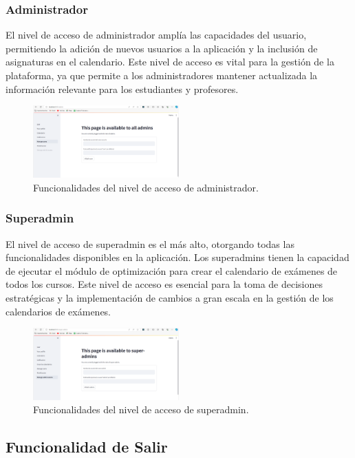 \documentclass{article}
\begin{document}
\subsubsection{Administrador}

El nivel de acceso de administrador amplía las capacidades del usuario, permitiendo la adición de nuevos usuarios a la aplicación y la inclusión de asignaturas en el calendario. Este nivel de acceso es vital para la gestión de la plataforma, ya que permite a los administradores mantener actualizada la información relevante para los estudiantes y profesores.

\begin{figure}[h!] \centering \includegraphics[width=0.5\textwidth]{nivel_administrador.png} \caption{Funcionalidades del nivel de acceso de administrador.} \end{figure}

\subsubsection{Superadmin}

El nivel de acceso de superadmin es el más alto, otorgando todas las funcionalidades disponibles en la aplicación. Los superadmins tienen la capacidad de ejecutar el módulo de optimización para crear el calendario de exámenes de todos los cursos. Este nivel de acceso es esencial para la toma de decisiones estratégicas y la implementación de cambios a gran escala en la gestión de los calendarios de exámenes.

\begin{figure}[h!] \centering \includegraphics[width=0.5\textwidth]{nivel_superadmin.png} \caption{Funcionalidades del nivel de acceso de superadmin.} \end{figure}
\subsection{Funcionalidad de Salir}
\end{document}
